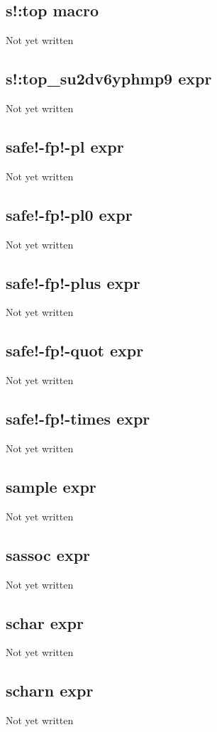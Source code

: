 \documentclass[a4paper,11pt]{article}
\begin{document}
\subsection{\ttfamily s!:top macro}
Not yet written

\subsection{\ttfamily s!:top\_su2dv6yphmp9 expr}
Not yet written

\subsection{\ttfamily safe!-fp!-pl expr}
Not yet written

\subsection{\ttfamily safe!-fp!-pl0 expr}
Not yet written

\subsection{\ttfamily safe!-fp!-plus expr}
Not yet written

\subsection{\ttfamily safe!-fp!-quot expr}
Not yet written

\subsection{\ttfamily safe!-fp!-times expr}
Not yet written

\subsection{\ttfamily sample expr}
Not yet written

\subsection{\ttfamily sassoc expr}
Not yet written

\subsection{\ttfamily schar expr}
Not yet written

\subsection{\ttfamily scharn expr}
Not yet written
\end{document}
